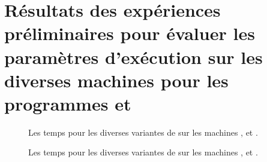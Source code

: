 
\chapter[Résultats des expériences préliminaires pour les programmes \TT{WordCount.java} et \TT{StockPrice.java}]{Résultats des expériences préliminaires pour évaluer les paramètres
d'exécution sur les diverses machines pour les programmes
 et }


\label{wordcount-java.ann}


\begin{figure}

\caption{Les temps pour les diverses variantes de  sur
les machines ,  et .}
\label{preliminaires-wordcount-java.fig}
\end{figure}



\newpage

\label{stockprice-java.ann}


\begin{figure}

\caption{Les temps pour les diverses variantes de  sur
les machines ,  et .}
\label{preliminaires-stockprice-java.fig}
\end{figure}

